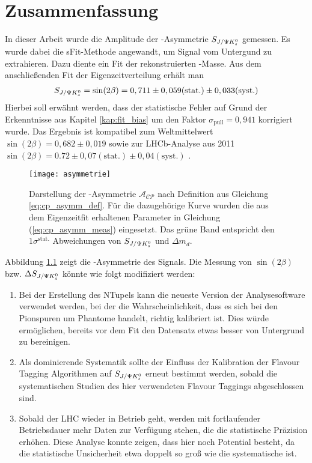 \chapter{Zusammenfassung}
In dieser Arbeit wurde die Amplitude der \CP-Asymmetrie $S_{J/\Psi K_s^0}$ gemessen. Es wurde dabei die sFit-Methode angewandt, um Signal vom Untergund zu extrahieren. Dazu diente ein Fit der rekonstruierten \Bd-Masse. Aus dem anschließenden Fit der Eigenzeitverteilung erhält man
\begin{align}
S_{J/\Psi K_s^0} = \sin(2\beta) = 0,711 \pm 0,059 (\text{stat.}) \pm 0,033 (\text{syst.})
\end{align}
Hierbei soll erwähnt werden, dass der statistische Fehler auf Grund der Erkenntnisse aus Kapitel \ref{kap:fit_bias} um den Faktor $\sigma_{\text{pull}} = 0,941$ korrigiert wurde. Das Ergebnis ist kompatibel zum Weltmittelwert $\sin(2\beta) = 0,682 \pm 0,019$ \cite{pdg-average} sowie zur LHCb-Analyse aus 2011 $\sin(2\beta) = 0.72 \pm 0,07 (\text{stat.}) \pm 0,04 (\text{syst.})$ \cite{lhcb-paper}. 

\begin{figure}[hptb]
\centering
\texttt{[image: asymmetrie]}
\caption{Darstellung der \CP-Asymmetrie $\mathcal{A_{CP}}$ nach Definition aus Gleichung \ref{eq:cp_asymm_def}. Für die dazugehörige Kurve wurden die aus dem Eigenzeitfit erhaltenen Parameter in Gleichung (\ref{eq:cp_asymm_meas}) eingesetzt. Das grüne Band entspricht den $1\sigma^{\text{stat.}}$ Abweichungen von $S_{J/\Psi K_s^0}$ und $\Delta m_d$.}
\label{fig:asymmetrie}
\end{figure}

Abbildung \ref{fig:asymmetrie} zeigt die \CP-Asymmetrie des Signals. Die Messung von $\sin(2\beta)$ bzw. $\Delta S_{J/\Psi K_s^0}$ könnte wie folgt modifiziert werden:
\begin{enumerate}
    \item Bei der Erstellung des NTupels kann die neueste Version der Analysesoftware verwendet werden, bei der die Wahrscheinlichkeit, dass es sich bei den Pionspuren um Phantome handelt, richtig kalibriert ist. Dies würde ermöglichen, bereits vor dem Fit den Datensatz etwas besser von Untergrund zu bereinigen.
    \item Als dominierende Systematik sollte der Einfluss der Kalibration der Flavour Tagging Algorithmen auf $S_{J/\Psi K_s^0}$ erneut bestimmt werden, sobald die systematischen Studien des hier verwendeten Flavour Taggings abgeschlossen sind.
    \item Sobald der LHC wieder in Betrieb geht, werden mit fortlaufender Betriebsdauer mehr Daten zur Verfügung stehen, die die statistische Präzision erhöhen. Diese Analyse konnte zeigen, dass hier noch Potential besteht, da die statistische Unsicherheit etwa doppelt so groß wie die systematische ist.
\end{enumerate}
